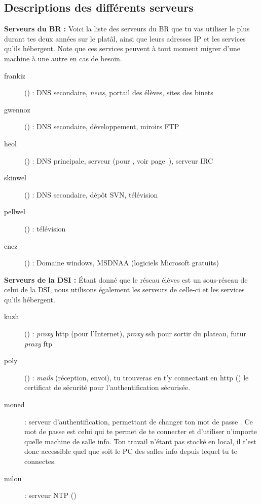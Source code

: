 \subsection{Descriptions des différents serveurs}
{\bf Serveurs du BR :} Voici la liste des serveurs du BR que tu vas
utiliser le plus durant tes deux années sur le platâl, ainsi que
leurs adresses IP et les services qu'ils hébergent. Note que ces services
peuvent à tout moment migrer d'une machine à une autre en cas de
besoin.


\begin{description}
        \item[frankiz] () : DNS secondaire,
        \emph{news}, portail des élèves, sites des binets
        \item[gwennoz] () : DNS secondaire,
        développement, miroirs FTP
        \item[heol] () : DNS principale,
        serveur  (pour , voir page~\pageref{qrezix}), serveur IRC
        \item[skinwel] () : DNS secondaire,
        dépôt SVN, télévision
	\item[pellwel] () : télévision
    \item[enez] () : Domaine windows, MSDNAA (logiciels Microsoft gratuits)
\end {description}

{\bf Serveurs de la DSI : } \'Etant donné que le réseau élèves est un
sous-réseau de celui de la DSI, nous utilisons également les
serveurs de celle-ci et les services qu'ils hébergent.

\begin{description}
        \item[kuzh] () : \emph{proxy} http (pour l'Internet), \emph{proxy} ssh pour sortir du plateau, futur \emph{proxy} ftp
        \item[poly] () : \emph{mails} (réception, envoi), tu trouveras en t'y connectant en http () le certificat de sécurité pour l'authentification sécurisée.
        \item[moned] : serveur d'authentification, permettant de
        changer ton mot de passe . Ce mot de passe est celui qui
        te permet de te connecter et d'utiliser n'importe
        quelle machine de salle info. Ton travail n'étant pas stocké
        en local, il t'est donc accessible quel que soit le PC des salles info depuis
        lequel tu te connectes.
    \item[milou] : serveur NTP ()
\end {description}

